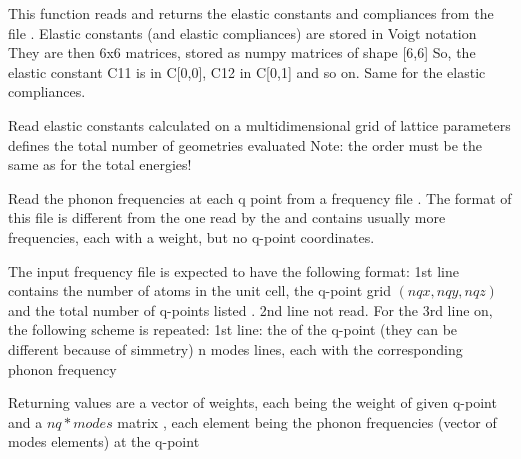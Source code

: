 \documentclass[letterpaper,10pt,english]{sphinxmanual}
\begin{document}

\begin{fulllineitems}
\label{pyqha:pyqha.read.read_elastic_constants}
This function reads and returns the elastic constants and compliances from
the file  .
Elastic constants (and elastic compliances) are stored in Voigt notation 
They are then 6x6 matrices, stored as numpy matrices of shape {[}6,6{]}
So, the elastic constant C11 is in C{[}0,0{]}, C12 in C{[}0,1{]} and so on.
Same for the elastic compliances.

\end{fulllineitems}


\begin{fulllineitems}
\label{pyqha:pyqha.read.read_elastic_constants_geo}
Read elastic constants calculated on a multidimensional grid of lattice parameters
 defines the total number of geometries evaluated
Note: the order must be the same as for the total energies!

\end{fulllineitems}


\begin{fulllineitems}
\label{pyqha:pyqha.read.read_freq}
Read the phonon frequencies at each q point from a frequency file .
The format of this file is different from the one read by the {\hyperref[pyqha:pyqha.read.read_freq]{}} and
contains usually more frequencies, each with a weight, but no q-point coordinates.

The input frequency file is expected to have the following format:
1st line contains the number of atoms in the unit cell, the q-point grid 
\((nqx, nqy, nqz)\) and the total number of q-points listed .
2nd line not read.   
For the 3rd line on, the following scheme is repeated:
1st line: the  of the q-point (they can be different because of simmetry)
n modes lines, each with the corresponding phonon frequency

Returning values are a  vector of weights, each  being the weight of given q-point 
and a \(nq*modes\) matrix , each element  being the phonon frequencies
(vector of modes elements) at the q-point 

\end{fulllineitems}
\end{document}
